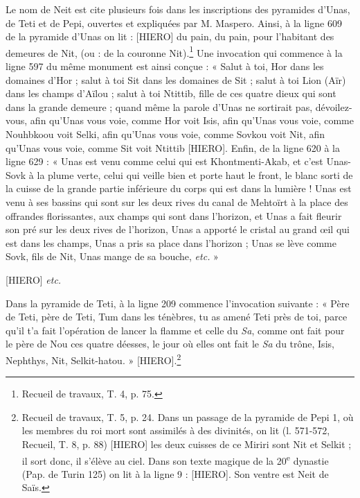 \documentclass[a4paper, 11pt, oneside]{article}
\begin{document}
Le nom de Neit est cite plusieurs fois dans les inscriptions des pyramides d'Unas, de Teti et de Pepi, ouvertes et expliquées par M. Maspero. Ainsi, à la ligne 609 de la pyramide d'Unas on lit : [HIERO] du pain, du pain, pour l'habitant des demeures de Nit, (ou : de la couronne Nit).\footnote{Recueil de travaux, T. 4, p. 75.} Une invocation qui commence à la ligne 597 du même monument est ainsi conçue : « Salut à toi, Hor dans les domaines d'Hor ; salut à toi Sit dans les domaines de Sit ; salut à toi Lion (Aïr) dans les champs d'Aïlou ; salut à toi Ntittib, fille de ces quatre dieux qui sont dans la grande demeure ; quand même la parole d'Unas ne sortirait pas, dévoilez-vous, afin qu'Unas vous voie, comme Hor voit Isis, afin qu'Unas vous voie, comme Nouhbkoou voit Selki, afin qu'Unas vous voie, comme Sovkou voit Nit, afin qu'Unas vous voie, comme Sit voit Ntittib [HIERO]. Enfin, de la ligne 620 à la ligne 629 : « Unas est venu comme celui qui est Khontmenti-Akab, et c'est Unas-Sovk à la plume verte, celui qui veille bien et porte haut le front, le blanc sorti de la cuisse de la grande partie inférieure du corps qui est dans la lumière ! Unas est venu à ses bassins qui sont sur les deux rives du canal de Mehtoïrt à la place des offrandes florissantes, aux champs qui sont dans l'horizon, et Unas a fait fleurir son pré sur les deux rives de l'horizon, Unas a apporté le cristal au grand œil qui est dans les champs, Unas a pris sa place dans l'horizon ; Unas se lève comme Sovk, fils de Nit, Unas mange de sa bouche, \emph{etc.} »

[HIERO] \emph{etc.}

Dans la pyramide de Teti, à la ligne 209 commence l'invocation suivante : « Père de Teti, père de Teti, Tum dans les ténèbres, tu as amené Teti près de toi, parce qu’il t'a fait l'opération de lancer la flamme et celle du \emph{Sa}, comme ont fait pour le père de Nou ces quatre déesses, le jour où elles ont fait le \emph{Sa} du trône, Isis, Nephthys, Nit, Selkit-hatou. » [HIERO].\footnote{Recueil de travaux, T. 5, p. 24.  Dans un passage de la pyramide de Pepi 1, où les membres du roi mort sont assimilés à des divinités, on lit (l. 571-572, Recueil, T. 8, p. 88) [HIERO] les deux cuisses de ce Miriri sont Nit et Selkit ; il sort donc, il s'élève au ciel.  Dans son texte magique de la 20\textsuperscript{e} dynastie (Pap. de Turin 125) on lit à la ligne 9 : [HIERO]. Son ventre est Neit de Saïs.}
\end{document}
